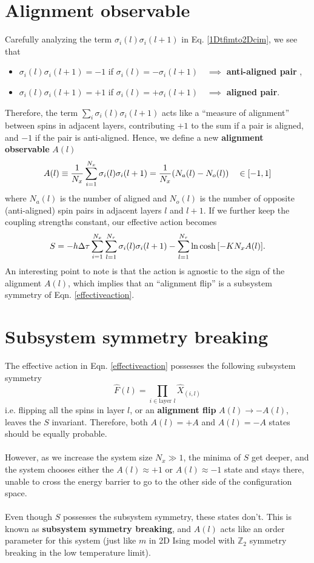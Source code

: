 \documentclass[../thesis_main.tex]{subfiles}
\begin{document}
\section{Alignment observable}
Carefully analyzing the term $\sigma_i(l) \sigma_i(l+1)$ in Eq. \eqref{1Dtfimto2Dcim}, we see that
\begin{itemize}
    \item $\sigma_i(l) \sigma_i(l+1) = -1$ if $\sigma_i(l) = - \sigma_i(l+1) \quad \implies$ \textbf{anti-aligned pair} ,
    \item $\sigma_i(l) \sigma_i(l+1) = +1$ if $\sigma_i(l) = + \sigma_i(l+1) \quad \implies$ \textbf{aligned pair}. 
\end{itemize}
Therefore, the term $\sum_i \sigma_i(l) \sigma_i(l+1)$ acts like a ``measure of alignment'' between spins in adjacent layers, contributing $+1$ to the sum if a pair is aligned, and $-1$ if the pair is anti-aligned. Hence, we define a new \textbf{alignment observable}  $A(l)$
\begin{equation}
    A(l) \equiv \frac{1}{N_x} \sum_{i=1}^{N_x} \sigma_i(l) \sigma_i(l+1) = \frac{1}{N_x}\qty(N_a(l) - N_o(l)) \quad \in [-1, 1] 
\end{equation}
where $N_a(l)$ is the number of aligned and $N_o(l)$ is the number of opposite (anti-aligned) spin pairs in adjacent layers $l$ and $l+1$. If we further keep the coupling strengths constant, our effective action becomes
\begin{equation}
    S = -h \Delta \tau  \sum_{i=1}^{N_x} \sum_{l=1}^{N_\tau} \sigma_i(l) \sigma_i(l+1) - \sum_{l=1}^{N_\tau} \ln \cosh \qty[-K N_x A(l)] .
    \label{effectiveaction}
\end{equation}
An interesting point to note is that the action is agnostic to the sign of the alignment $A(l)$, which implies that an ``alignment flip'' is a subsystem symmetry of Eqn. \eqref{effectiveaction}. 

\section{Subsystem symmetry breaking}
The effective action in Eqn. \eqref{effectiveaction} possesses the following subsystem symmetry 
\[
    \hat{F}(l) = \prod_{i \in \text{layer } l} \hat{X}_{(i,l)}
\]
i.e. flipping all the spins in layer $l$, or an \textbf{alignment flip} $A(l) \rightarrow -A(l)$,  leaves the $S$ invariant. Therefore, both $A(l) = +A$ and $A(l) = -A$ states should be equally probable. ~\\~\\
However, as we increase the system size $N_x \gg 1$, the minima of $S$ get deeper, and the system chooses either the $A(l) \approx +1$ or $A(l) \approx -1$ state and stays there, unable to cross the energy barrier to go to the other side of the configuration space.~\\~\\
Even though $S$ possesses the subsystem symmetry, these states don't. This is known as \textbf{subsystem symmetry breaking}, and $A(l)$ acts like an order parameter for this system (just like $m$ in 2D Ising model with $\mathbb{Z}_2$ symmetry breaking in the low temperature limit).
\end{document}
